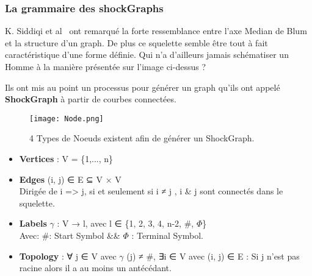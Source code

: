 \subsubsection{La grammaire des shockGraphs}


K. Siddiqi et al~\cite{Siddiqi1999} ont remarqué la forte ressemblance entre l'axe Median de Blum et la structure d'un graph. De plus ce squelette semble être tout à fait caractéristique d'une forme définie. Qui n'a d'ailleurs jamais schématiser un Homme à la manière présentée sur l'image ci-dessus ? 

Ils ont mis au point un processus pour générer un graph qu'ils ont appelé \textbf{ShockGraph} à partir de courbes connectées.

\begin{figure}[H]
    \centering
    \texttt{[image: Node.png]}
	\caption{4 Types de Noeuds existent afin de générer un ShockGraph.}\label{image.skel} 
\end{figure}

\begin{itemize}
	\item \textbf{Vertices} : V = \{1,..., n\} \\
	
	\item \textbf{Edges} (i, j) ∈ E ⊆ V × V \\
	Dirigée de i => j, si et seulement si i ≠ j , i \& j sont connectés dans le squelette.\\
	
	\item \textbf{Labels} $\gamma$ : V → l, avec l ∈ \{1, 2, 3, 4, n-2, \#, $\Phi$\}\\
	Avec: \#: Start Symbol \&\& $\Phi$ : Terminal Symbol.\\
	
	\item \textbf{Topology} : ∀ j ∈ V avec $\gamma$ (j) ≠ \#, ∃i ∈ V avec (i, j) ∈ E : Si j n’est pas racine alors il a au moins un antécédant.

\end{itemize}

\clearpage